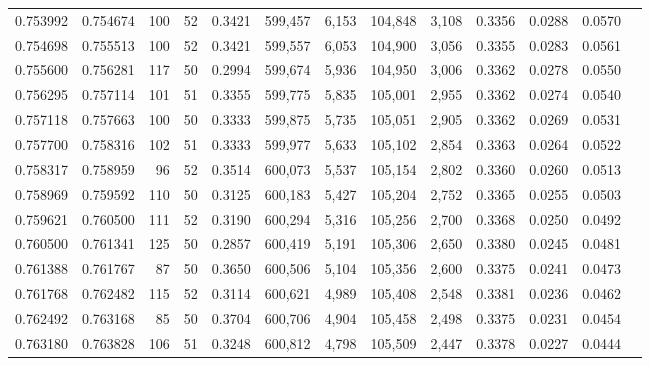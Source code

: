 \begin{tabular}{rrrrrrrrrrrrr}
0.753992 & 0.754674 &   100 &  52 &                                     0.3421 & 599,457 &   6,153 & 104,848 &   3,108 & 0.3356 & 0.0288 & 0.0570 \\
0.754698 & 0.755513 &   100 &  52 &                                     0.3421 & 599,557 &   6,053 & 104,900 &   3,056 & 0.3355 & 0.0283 & 0.0561 \\
0.755600 & 0.756281 &   117 &  50 &                                     0.2994 & 599,674 &   5,936 & 104,950 &   3,006 & 0.3362 & 0.0278 & 0.0550 \\
0.756295 & 0.757114 &   101 &  51 &                                     0.3355 & 599,775 &   5,835 & 105,001 &   2,955 & 0.3362 & 0.0274 & 0.0540 \\
0.757118 & 0.757663 &   100 &  50 &                                     0.3333 & 599,875 &   5,735 & 105,051 &   2,905 & 0.3362 & 0.0269 & 0.0531 \\
0.757700 & 0.758316 &   102 &  51 &                                     0.3333 & 599,977 &   5,633 & 105,102 &   2,854 & 0.3363 & 0.0264 & 0.0522 \\
0.758317 & 0.758959 &    96 &  52 &                                     0.3514 & 600,073 &   5,537 & 105,154 &   2,802 & 0.3360 & 0.0260 & 0.0513 \\
0.758969 & 0.759592 &   110 &  50 &                                     0.3125 & 600,183 &   5,427 & 105,204 &   2,752 & 0.3365 & 0.0255 & 0.0503 \\
0.759621 & 0.760500 &   111 &  52 &                                     0.3190 & 600,294 &   5,316 & 105,256 &   2,700 & 0.3368 & 0.0250 & 0.0492 \\
0.760500 & 0.761341 &   125 &  50 &                                     0.2857 & 600,419 &   5,191 & 105,306 &   2,650 & 0.3380 & 0.0245 & 0.0481 \\
0.761388 & 0.761767 &    87 &  50 &                                     0.3650 & 600,506 &   5,104 & 105,356 &   2,600 & 0.3375 & 0.0241 & 0.0473 \\
0.761768 & 0.762482 &   115 &  52 &                                     0.3114 & 600,621 &   4,989 & 105,408 &   2,548 & 0.3381 & 0.0236 & 0.0462 \\
0.762492 & 0.763168 &    85 &  50 &                                     0.3704 & 600,706 &   4,904 & 105,458 &   2,498 & 0.3375 & 0.0231 & 0.0454 \\
0.763180 & 0.763828 &   106 &  51 &                                     0.3248 & 600,812 &   4,798 & 105,509 &   2,447 & 0.3378 & 0.0227 & 0.0444 \\

\end{tabular}
